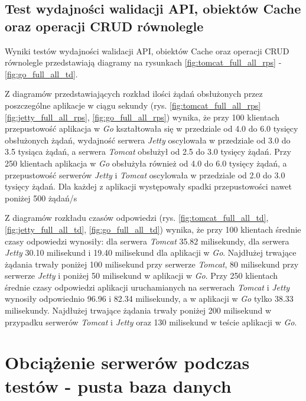 % 
\clearpage

\subsection{Test wydajności walidacji API, obiektów Cache oraz operacji CRUD równolegle}

Wyniki testów wydajności walidacji API, obiektów Cache oraz operacji CRUD równolegle przedstawiają diagramy na rysunkach \ref{fig:tomcat_full_all_rps} - \ref{fig:go_full_all_td}.              

Z diagramów przedstawiających rozkład ilości żądań obsłużonych przez poszczególne aplikacje w ciągu sekundy  (rys. \ref{fig:tomcat_full_all_rps} \ref{fig:jetty_full_all_rps}, \ref{fig:go_full_all_rps}) wynika, że przy 100 klientach przepustowość aplikacja w \textsl{Go} kształtowała się w przedziale od 4.0 do 6.0 tysięcy obsłużonych żądań, wydajność serwera \textsl{Jetty} oscylowała w przedziale od 3.0 do 3.5 tysiąca  żądań, a  serwera \textsl{Tomcat}  obsłużył od 2.5 do 3.0 tysięcy żądań. Przy 250 klientach aplikacja w \textsl{Go} obsłużyła również od 4.0 do 6.0 tysięcy żądań, a przepustowość serwerów \textsl{Jetty} i \textsl{Tomcat} oscylowała w przedziale od 2.0 do 3.0 tysięcy żądań. Dla każdej z aplikacji występowały spadki przepustowości nawet poniżej 500 żądań/s

Z diagramów rozkładu czasów odpowiedzi (rys. \ref{fig:tomcat_full_all_td}, \ref{fig:jetty_full_all_td}, \ref{fig:go_full_all_td}) wynika, że przy 100 klientach średnie czasy odpowiedzi wynosiły: dla serwera \textsl{Tomcat} 35.82 milisekundy, dla serwera \textsl{Jetty} 30.10 milisekund i 19.40 milisekund dla aplikacji w \textsl{Go}. Najdłużej trwające żądania trwały poniżej 100 milisekund przy serwerze \textsl{Tomcat}, 80 milisekund przy serwerze \textsl{Jetty} i  poniżej 50 milisekund  w aplikacji w \textsl{Go}. Przy 250 klientach średnie czasy odpowiedzi aplikacji uruchamianych na serwerach \textsl{Tomcat}  i \textsl{Jetty}   wynosiły odpowiednio 96.96 i 82.34 milisekundy, a w aplikacji w \textsl{Go} tylko 38.33 milisekundy. Najdłużej trwające żądania trwały poniżej 200 milisekund w przypadku serwerów \textsl{Tomcat} i \textsl{Jetty} oraz 130 milisekund w teście aplikacji w \textsl{Go}.

% 
\clearpage

\section{Obciążenie serwerów podczas testów - pusta baza danych}

